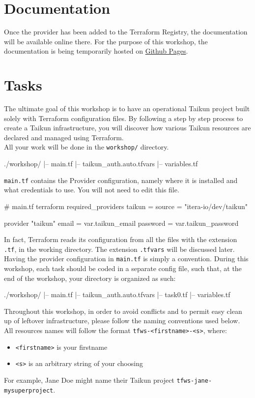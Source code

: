 \section{Documentation}
Once the provider has been added to the Terraform Registry, the documentation will be available online there.
For the purpose of this workshop, the documentation is being temporarily hosted on \href{https://intuinewin.github.io/taikun-docs/}{Github Pages}.

\section{Tasks}
The ultimate goal of this workshop is to have an operational Taikun project built solely with Terraform
configuration files.
By following a step by step process to create a Taikun infrastructure,
you will discover how various Taikun resources are declared and managed using Terraform.\\

All your work will be done in the \texttt{workshop/} directory.
\begin{raw}
./workshop/
|-- main.tf
|-- taikun_auth.auto.tfvars
|-- variables.tf
\end{raw}
\texttt{main.tf} contains the Provider configuration, namely where it is installed
and what credentials to use. You will not need to edit this file.
\begin{tf}
# main.tf
terraform {
  required_providers {
    taikun = {
      source = "itera-io/dev/taikun"
    }
  }
}

provider "taikun" {
  email    = var.taikun_email
  password = var.taikun_password
}
\end{tf}
In fact, Terraform reads its configuration from all the files with the extension \texttt{.tf},
in the working directory. The extension \texttt{.tfvars} will be discussed later.
Having the provider configuration in \texttt{main.tf} is simply a convention.
During this workshop, each task should be coded in a separate config file,
such that, at the end of the workshop, your directory is organized as such:
\begin{raw}
./workshop/
|-- main.tf
|-- taikun_auth.auto.tfvars
|-- task0.tf
|-- variables.tf
\end{raw}


\begin{warn}
  Throughout this workshop, in order to avoid conflicts and
  to permit easy clean up of leftover infrastructure, please follow the naming conventions used below.\\

  All resources names will follow the format \texttt{tfws-<firstname>-<s>}, where:
  \begin{itemize}
    \item \texttt{<firstname>} is your firstname
    \item \texttt{<s>} is an arbitrary string of your choosing
  \end{itemize}
  For example, Jane Doe might name their Taikun project \texttt{tfws-jane-mysuperproject}.
\end{warn}


